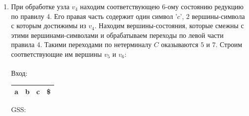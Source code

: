 \begin{example}
\begin{enumerate}
        \\
        
        \item При обработке узла $v_4$ находим соответствующею 6-ому состоянию редукцию по правилу 4. Его правая часть содержит один символ '$c$', 2 вершины-символа с которым достижимы из $v_4$. Находим вершины-состояния, которые смежны с этими вершинами-символами и обрабатываем переходы по левой части правила 4. Такими переходами по нетерминалу $C$ оказываются $5$ и $7$. Строим соответствующие им вершины $v_5$ и $v_6$:\\ \\
        Вход: \,
        \begin{tabular}[c]{ |c|c|c|c| } 
            \hline a & b & c & \$ \\ \hline
        \end{tabular}
        \qquad GSS: \,
        \begin{tikzpicture}[x=0.5pt,y=0.5pt,yscale=-1,xscale=1]
        

\end{tikzpicture}
\end{enumerate}
\end{example}
